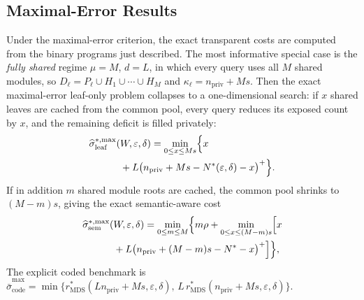 \documentclass[journal]{IEEEtran}
\numberwithin{equation}{section}
\begin{document}
\subsection{Maximal-Error Results}
\label{subsec:numerical-max-results}

Under the maximal-error criterion, the exact transparent costs are computed
from the binary programs just described.  The most informative special case is
the
\emph{fully shared} regime \(\mu=M\), \(d=L\), in which every query uses all
\(M\) shared modules, so \(D_\ell=P_\ell\cup H_1\cup\cdots\cup H_M\) and
\(\kappa_\ell=n_{\mathrm{priv}}+Ms\).  Then the exact maximal-error leaf-only
problem collapses to a one-dimensional search: if \(x\) shared leaves are
cached from the common pool, every query reduces its exposed count by \(x\),
and the remaining deficit is filled privately:
\begin{equation}
  \begin{split}
    \widehat{\sigma}_{\mathrm{leaf}}^{*,\max}( & W,\varepsilon,\delta)
    =
    \min_{0\le x\le Ms}
    \Bigl\{ x \\
    & + L\bigl( n_{\mathrm{priv}} + Ms - N^*(\varepsilon,\delta) - x \bigr)^+ \Bigr\}.
  \end{split}
\label{eq:numerical-max-leaf-fullshare}
\end{equation}
If in addition \(m\) shared module roots are cached, the common pool shrinks
to \((M-m)s\), giving the exact semantic-aware cost
\begin{equation}
  \begin{split}
    \widehat{\sigma}_{\mathrm{sem}}^{*,\max}
    ( & W,\varepsilon,\delta)
    = \min_{0\le m\le M}\Bigl\{ m\rho + \min_{0\le x\le (M-m)s} \Bigl[ x \\
    & + L\bigl( n_{\mathrm{priv}}+(M-m)s-N^* - x \bigr)^+ \Bigr] \Bigr\},
  \end{split}
\label{eq:numerical-max-sem-fullshare}
\end{equation}
The explicit coded benchmark is
\(\widehat{\bar{\sigma}}_{\mathrm{code}}^{\max}
=\min\{r_{\mathrm{MDS}}^{*}(Ln_{\mathrm{priv}}+Ms,\varepsilon,\delta),\,
L\,r_{\mathrm{MDS}}^{*}(n_{\mathrm{priv}}+Ms,\varepsilon,\delta)\}\).
\end{document}
